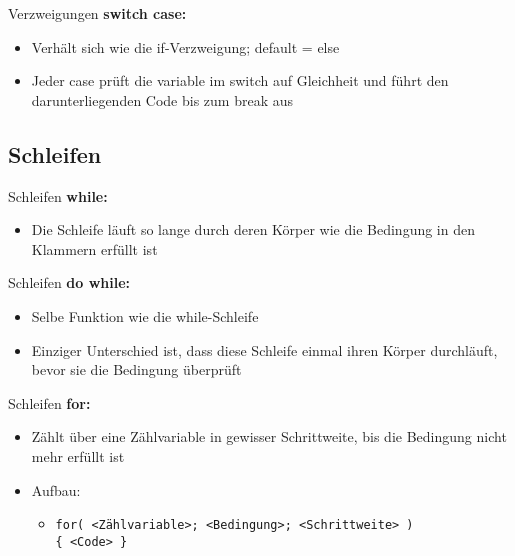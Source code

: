 \begin{frame}{Verzweigungen}
	\textbf{switch case:}\\
	\begin{itemize}
		\item Verhält sich wie die if-Verzweigung; default = else
		\item Jeder case prüft die variable im switch auf Gleichheit und führt den darunterliegenden Code bis zum break aus
	\end{itemize}
	
\end{frame}

\subsection{Schleifen}
\begin{frame}{Schleifen}
	\textbf{while:} \\
	\begin{itemize}
		\item Die Schleife läuft so lange durch deren Körper wie die Bedingung in den Klammern erfüllt ist
	\end{itemize}
		
\end{frame}

\begin{frame}{Schleifen}
	\textbf{do while:} \\
	\begin{itemize}
		\item Selbe Funktion wie die while-Schleife
		\item Einziger Unterschied ist, dass diese Schleife einmal ihren Körper durchläuft, bevor sie die Bedingung überprüft
	\end{itemize}
		
\end{frame}

\begin{frame}{Schleifen}
	\textbf{for:} \\
	\begin{itemize}
		\item Zählt über eine Zählvariable in gewisser Schrittweite, bis die Bedingung nicht mehr erfüllt ist
		\item Aufbau:
		\begin{itemize}
			\item \alert{\texttt{for( <Zählvariable>; <Bedingung>; <Schrittweite> )\\ \{ <Code> \}}}
		\end{itemize}
	\end{itemize}
		
\end{frame}

